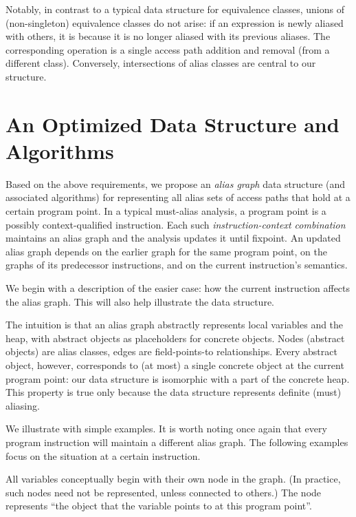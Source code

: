 Notably, in contrast to a typical data structure for equivalence classes, unions of (non-singleton) equivalence classes do not arise: if an expression is newly aliased with others, it is because it is no longer aliased with its previous aliases. The corresponding operation is a single access path addition and removal (from a different class). Conversely, intersections of alias classes are central to our structure.


\section{An Optimized Data Structure and Algorithms}

Based on the above requirements, we propose an \emph{alias graph} data structure (and associated algorithms) for representing all alias sets of access paths that hold at a certain program point. In a typical must-alias analysis, a program point is a possibly context-qualified instruction. Each such \emph{instruction-context combination} maintains an alias graph and the analysis updates it until fixpoint. An updated alias graph depends on the earlier graph for the same program point, on the graphs of its predecessor instructions, and on the current instruction's semantics.

We begin with a description of the easier case: how the current instruction affects the alias graph. This will also help illustrate the data structure.

The intuition is that an alias graph abstractly represents local variables and the heap, with abstract objects as placeholders for concrete objects. Nodes (abstract objects) are alias classes, edges are field-points-to relationships. Every abstract object, however, corresponds to (at most) a single concrete object at the current program point: our data structure is isomorphic with a part of the concrete heap. This property is true only because the data structure represents definite (must) aliasing.

We illustrate with simple examples. It is worth noting once again that every program instruction will maintain a different alias graph. The following examples focus on the situation at a certain instruction.

All variables conceptually begin with their own node in the graph. (In practice, such nodes need not be represented, unless connected to others.) The node represents ``the object that the variable points to at this program point''.

